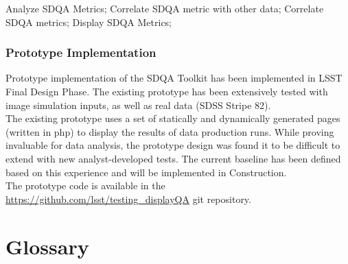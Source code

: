 \documentclass[12pt]{article}
\begin{document}
Analyze SDQA Metrics; Correlate SDQA metric with other data; Correlate SDQA metrics; Display SDQA Metrics;

\subsubsection{Prototype Implementation}

Prototype implementation of the SDQA Toolkit has been implemented in LSST Final Design Phase. The existing prototype has been extensively tested with image simulation inputs, as well as real data (SDSS Stripe 82).
\\

The existing prototype uses a set of statically and dynamically generated pages (written in php) to display the results of data production runs. While proving invaluable for data analysis, the prototype design was found it to be difficult to extend with new analyst-developed tests. The current baseline has been defined based on this experience and will be implemented in Construction.
\\

The prototype code is available in the \url{https://github.com/lsst/testing_displayQA} git repository.

\clearpage

\section{Glossary}
\end{document}
